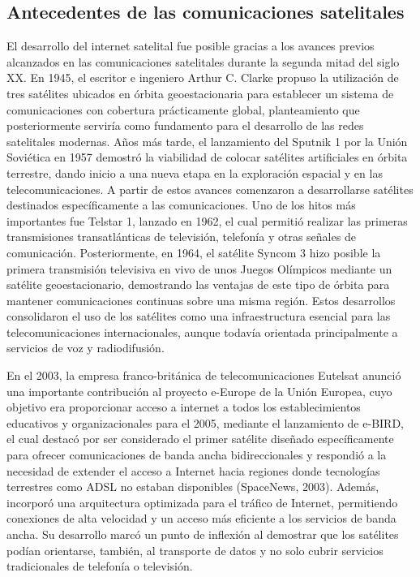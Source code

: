 \subsection{Antecedentes de las comunicaciones satelitales}
El desarrollo del internet satelital fue posible gracias a los avances previos alcanzados en las comunicaciones satelitales durante la segunda mitad del siglo XX. En 1945, el escritor e ingeniero Arthur C. Clarke propuso la utilización de tres satélites ubicados en órbita geoestacionaria para establecer un sistema de comunicaciones con cobertura prácticamente global, planteamiento que posteriormente serviría como fundamento para el desarrollo de las redes satelitales modernas. Años más tarde, el lanzamiento del Sputnik 1 por la Unión Soviética en 1957 demostró la viabilidad de colocar satélites artificiales en órbita terrestre, dando inicio a una nueva etapa en la exploración espacial y en las telecomunicaciones.
A partir de estos avances comenzaron a desarrollarse satélites destinados específicamente a las comunicaciones. Uno de los hitos más importantes fue Telstar 1, lanzado en 1962, el cual permitió realizar las primeras transmisiones transatlánticas de televisión, telefonía y otras señales de comunicación. Posteriormente, en 1964, el satélite Syncom 3 hizo posible la primera transmisión televisiva en vivo de unos Juegos Olímpicos mediante un satélite geoestacionario, demostrando las ventajas de este tipo de órbita para mantener comunicaciones continuas sobre una misma región. Estos desarrollos consolidaron el uso de los satélites como una infraestructura esencial para las telecomunicaciones internacionales, aunque todavía orientada principalmente a servicios de voz y radiodifusión.

En el 2003, la empresa franco-británica de telecomunicaciones Eutelsat anunció una importante contribución al proyecto e-Europe de la Unión Europea, cuyo objetivo era proporcionar acceso a internet a todos los establecimientos educativos y organizacionales para el 2005, mediante el lanzamiento de e-BIRD, el cual destacó por ser considerado el primer satélite diseñado específicamente para ofrecer comunicaciones de banda ancha bidireccionales y respondió a la necesidad de extender el acceso a Internet hacia regiones donde tecnologías terrestres como ADSL no estaban disponibles (SpaceNews, 2003). Además, incorporó una arquitectura optimizada para el tráfico de Internet, permitiendo conexiones de alta velocidad y un acceso más eficiente a los servicios de banda ancha. Su desarrollo marcó un punto de inflexión al demostrar que los satélites podían orientarse, también, al transporte de datos y no solo cubrir servicios tradicionales de telefonía o televisión.

